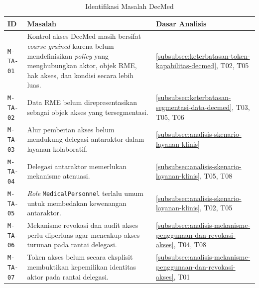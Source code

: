 \documentclass[bahasa, 12pt, a4paper, onecolumn, oneside, final]{report}
\begin{document}
\begin{table}[!ht]
	\centering
	\caption{Identifikasi Masalah DecMed}
	\label{tab:identifikasi-masalah-decmed}
	\small
	\begin{tabular}{|p{}|p{}|p{}|}
		\hline
		\textbf{ID}      & \textbf{Masalah}                                                                                                                                                                       & \textbf{Dasar Analisis}                                                    \\ \hline
		\texttt{M-TA-01} & Kontrol akses DecMed masih bersifat \textit{coarse-grained} karena belum mendefinisikan \textit{policy} yang menghubungkan aktor, objek RME, hak akses, dan kondisi secara lebih luas. & \ref{subsubsec:keterbatasan-token-kapabilitas-decmed}, T02, T05            \\ \hline
		\texttt{M-TA-02} & Data RME belum direpresentasikan sebagai objek akses yang tersegmentasi.                                                                                                               & \ref{subsubsec:keterbatasan-segmentasi-data-decmed}, T03, T05, T06         \\ \hline
		\texttt{M-TA-03} & Alur pemberian akses belum mendukung delegasi antaraktor dalam layanan kolaboratif.                                                                                                    & \ref{subsubsec:analisis-skenario-layanan-klinis}                           \\ \hline
		\texttt{M-TA-04} & Delegasi antaraktor memerlukan mekanisme atenuasi.                                                                                                                                     & \ref{subsubsec:analisis-skenario-layanan-klinis},     T05, T08             \\ \hline
		\texttt{M-TA-05} & \textit{Role} \texttt{MedicalPersonnel} terlalu umum untuk membedakan kewenangan antaraktor.                                                                                           & \ref{subsubsec:analisis-skenario-layanan-klinis}, T02, T05                 \\ \hline
		\texttt{M-TA-06} & Mekanisme revokasi dan audit akses perlu diperluas agar mencakup akses turunan pada rantai delegasi.                                                                                   & \ref{subsubsec:analisis-mekanisme-penggunaan-dan-revokasi-akses}, T04, T08 \\ \hline
		\texttt{M-TA-07} & Token akses belum secara eksplisit membuktikan kepemilikan identitas aktor pada rantai delegasi.                                                                                       & \ref{subsubsec:analisis-mekanisme-penggunaan-dan-revokasi-akses}, T01      \\ \hline
	\end{tabular}
\end{table}
\end{document}
